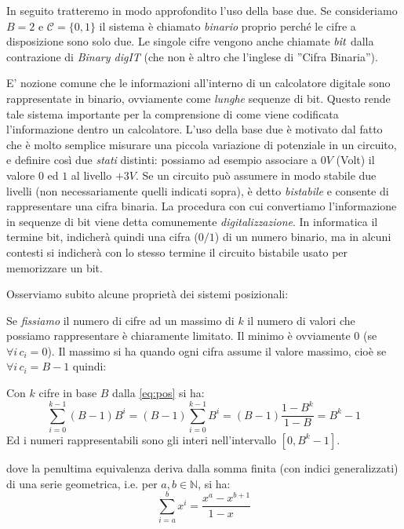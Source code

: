In seguito tratteremo in modo approfondito l'uso della base due. Se consideriamo $B = 2$ e $\mathcal{C} = \{ 0, 1 \}$ il sistema è
chiamato \emph{binario} proprio perché le cifre a disposizione sono solo due.
Le singole cifre vengono anche chiamate $\emph{bit}$ dalla contrazione di
\emph{Binary digIT} (che non è altro che l'inglese di ''Cifra
Binaria'').

E' nozione comune che le informazioni all'interno di un calcolatore digitale
sono rappresentate in binario, ovviamente come \emph{lunghe} sequenze di bit.
Questo rende tale sistema importante per la comprensione di come viene
codificata l'informazione dentro un calcolatore. L'uso della base due è
motivato dal fatto che è molto semplice misurare una piccola variazione di
potenziale in un circuito, e definire così due \emph{stati} distinti: possiamo
ad esempio associare a $0V$ (Volt) il valore $0$ ed $1$ al livello $+3V$. Se
un circuito può assumere in modo stabile due livelli (non necessariamente
quelli indicati sopra), è detto \emph{bistabile} e consente di rappresentare
una cifra binaria. La procedura con cui convertiamo l'informazione in sequenze
di bit viene detta comunemente \emph{digitalizzazione}. In informatica il
termine bit, indicherà quindi una cifra ($0/1$) di un numero binario, ma in
alcuni contesti si indicherà con lo stesso termine il circuito bistabile usato
per memorizzare un bit.

Osserviamo subito alcune proprietà dei sistemi posizionali: 

Se \emph{fissiamo} il numero di cifre ad un massimo di $k$ il numero di valori che possiamo rappresentare è chiaramente limitato. Il minimo è ovviamente $0$ (se $\forall i \, c_i = 0$). Il massimo si ha quando ogni  cifra assume il valore massimo, cioè se $\forall i\, c_i = B-1$ quindi:

\begin{observe}
Con $k$ cifre in base $B$ dalla \eqref{eq:pos} si ha:
\begin{equation}\label{eq:range} \sum_{i=0}^{k-1} (B-1)B^i = (B-1)
\sum_{i=0}^{k-1} B^i = (B-1) \frac{1-B^k}{1-B} = B^k-1 \end{equation}
Ed i numeri rappresentabili sono gli interi nell'intervallo $[0,B^k-1]$.
\end{observe}

\noindent dove la penultima equivalenza deriva dalla somma finita (con indici
generalizzati) di una serie geometrica, i.e. per $a,b \in \mathbb{N}$, si ha:
\[ \sum_{i=a}^{b} x^i = \frac{x^a-x^{b+1}}{1-x\quad} \]

